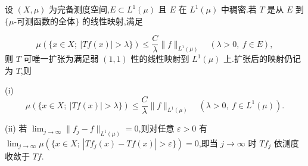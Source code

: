 \begin{lemma}\label{lem:1.8.4}
\begin{sloppypar}
设 $(X, \mu)$ 为完备测度空间,$E \subset L^{1}(\mu)$ 且 $E$ 在 $L^{1}(\mu)$ 中稠密.若 $T$ 是从 $E$ 到 $\{\mu\text{-可测函数的全体}\}$ 的线性映射,满足
\end{sloppypar}
\begin{equation*}
\mu(\{x \in X;\ |Tf(x)| > \lambda\}) \leq \frac{C}{\lambda}\| f \|_{L^{1}(\mu)} \quad (\lambda > 0,\ f \in E),
\end{equation*}
则 $T$ 可唯一扩张为满足弱 $(1,1)$ 性的线性映射到 $L^{1}(\mu)$ 上.扩张后的映射仍记为 $T$,则

(i)
\begin{equation*}
\mu(\{x \in X;\ |Tf(x)| > \lambda\}) \leq \frac{C}{\lambda}\| f \|_{L^{1}(\mu)} \quad (\lambda > 0,\ f \in L^{1}(\mu)).
\end{equation*}

(ii) 若 $\lim_{j \to \infty}\| f_{j} - f \|_{L^{1}(\mu)} = 0$,则对任意 $\varepsilon > 0$ 有 $\lim_{j \to \infty}\mu(\{x \in X;\ |Tf_{j}(x) - Tf(x)| > \varepsilon\}) = 0$,即当 $j \to \infty$ 时 $Tf_{j}$ 依测度收敛于 $Tf$.
\end{lemma}


